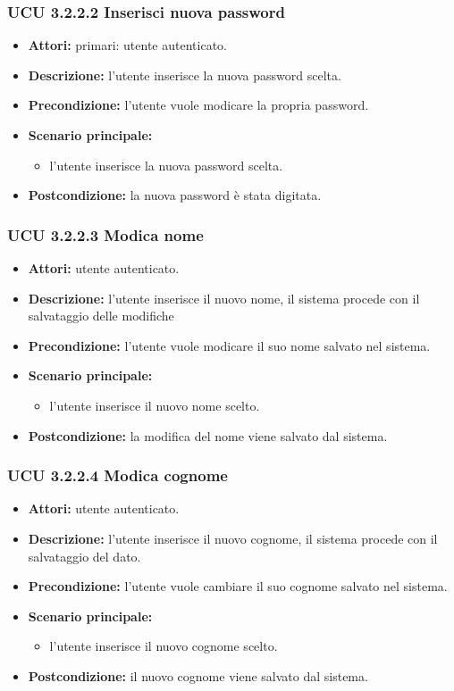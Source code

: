 \subsubsection{UCU 3.2.2.2 Inserisci nuova password}
\begin{itemize}
	\item \textbf{Attori: } primari: utente autenticato.
	\item \textbf{Descrizione: } l'utente inserisce la nuova password scelta.
	\item \textbf{Precondizione: } l'utente vuole modicare la propria password.
	\item \textbf{Scenario principale:}
	\begin{itemize}
		\item l'utente inserisce la nuova password scelta.
	\end{itemize}
	\item \textbf{Postcondizione:} la nuova password è stata digitata.
\end{itemize}

\subsubsection{UCU 3.2.2.3 Modica nome}
\begin{itemize}
	\item \textbf{Attori: } utente autenticato.
	\item \textbf{Descrizione: } l'utente inserisce il nuovo nome, il sistema procede con il salvataggio delle modifiche
	\item \textbf{Precondizione: } l'utente vuole modicare il suo nome salvato nel sistema.
	\item \textbf{Scenario principale:}
	\begin{itemize}
		\item l'utente inserisce il nuovo nome scelto.
	\end{itemize}
	\item \textbf{Postcondizione:} la modifica del nome viene salvato dal sistema.
\end{itemize}

\subsubsection{UCU 3.2.2.4  Modica cognome}
\begin{itemize}
	\item \textbf{Attori: }  utente autenticato.
	\item \textbf{Descrizione: } l'utente inserisce il nuovo cognome, il sistema procede con il salvataggio del dato.
	\item \textbf{Precondizione: } l'utente vuole cambiare il suo cognome salvato nel sistema.
	\item \textbf{Scenario principale:}
	\begin{itemize}
		\item l'utente inserisce il nuovo cognome scelto.
	\end{itemize}
	\item \textbf{Postcondizione:} il nuovo cognome viene salvato dal sistema.
\end{itemize}

